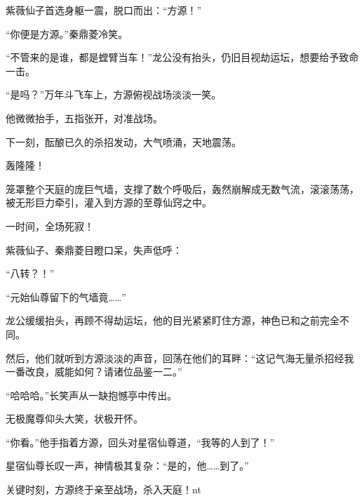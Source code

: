 \begin{this_body}
紫薇仙子首选身躯一震，脱口而出：“方源！”

“你便是方源。”秦鼎菱冷笑。

“不管来的是谁，都是螳臂当车！”龙公没有抬头，仍旧目视劫运坛，想要给予致命一击。

“是吗？”万年斗飞车上，方源俯视战场淡淡一笑。

他微微抬手，五指张开，对准战场。

下一刻，酝酿已久的杀招发动，大气喷涌，天地震荡。

轰隆隆！

笼罩整个天庭的庞巨气墙，支撑了数个呼吸后，轰然崩解成无数气流，滚滚荡荡，被无形巨力牵引，灌入到方源的至尊仙窍之中。

一时间，全场死寂！

紫薇仙子、秦鼎菱目瞪口呆，失声低呼：

“八转？！”

“元始仙尊留下的气墙竟……”

龙公缓缓抬头，再顾不得劫运坛，他的目光紧紧盯住方源，神色已和之前完全不同。

然后，他们就听到方源淡淡的声音，回荡在他们的耳畔：“这记气海无量杀招经我一番改良，威能如何？请诸位品鉴一二。”

“哈哈哈。”长笑声从一缺抱憾亭中传出。

无极魔尊仰头大笑，状极开怀。

“你看。”他手指着方源，回头对星宿仙尊道，“我等的人到了！”

星宿仙尊长叹一声，神情极其复杂：“是的，他……到了。”

关键时刻，方源终于亲至战场，杀入天庭！nt

\end{this_body}

